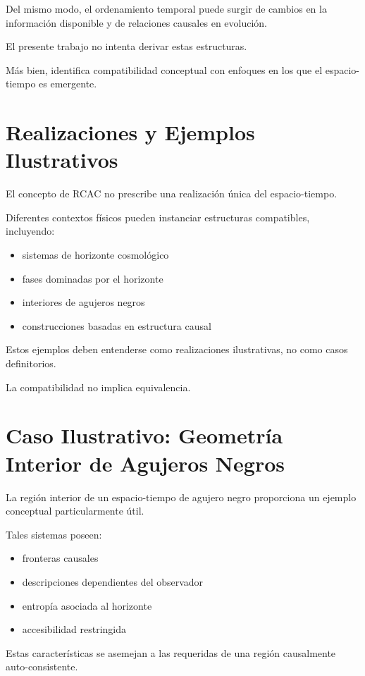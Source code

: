 \documentclass[12pt,a4paper]{article}
\begin{document}
Del mismo modo, el ordenamiento temporal puede surgir de cambios en la información disponible y de relaciones causales en evolución.

El presente trabajo no intenta derivar estas estructuras.

Más bien, identifica compatibilidad conceptual con enfoques en los que el espacio-tiempo es emergente.

\section{Realizaciones y Ejemplos Ilustrativos}

El concepto de RCAC no prescribe una realización única del espacio-tiempo.

Diferentes contextos físicos pueden instanciar estructuras compatibles, incluyendo:

\begin{itemize}
  \item sistemas de horizonte cosmológico
  \item fases dominadas por el horizonte
  \item interiores de agujeros negros
  \item construcciones basadas en estructura causal
\end{itemize}

Estos ejemplos deben entenderse como realizaciones ilustrativas, no como casos definitorios.

La compatibilidad no implica equivalencia.

\section{Caso Ilustrativo: Geometría Interior de Agujeros Negros}

La región interior de un espacio-tiempo de agujero negro proporciona un ejemplo conceptual particularmente útil.

Tales sistemas poseen:

\begin{itemize}
  \item fronteras causales
  \item descripciones dependientes del observador
  \item entropía asociada al horizonte
  \item accesibilidad restringida
\end{itemize}

Estas características se asemejan a las requeridas de una región causalmente auto-consistente.
\end{document}
